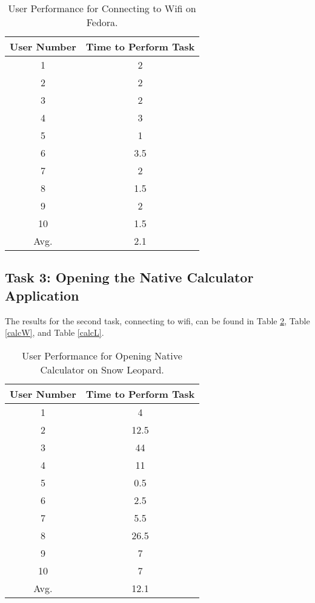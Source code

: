 \documentclass[11pt,letterpaper]{report}
\begin{document}
\begin{table}
    \centering
    \begin{tabular}{| c | c |}
        \hline
        User Number & Time to Perform Task \\ \hline
        1 & 2 \\  \hline
        2 & 2 \\  \hline
        3 & 2 \\ \hline
        4 & 3 \\  \hline
        5 & 1 \\    \hline
        6 & 3.5 \\  \hline
        7 & 2 \\ \hline
        8 & 1.5 \\  \hline
        9 & 2 \\ \hline
        10 & 1.5 \\ \hline
        Avg. & 2.1 \\
        \hline
    \end{tabular}
    \caption{User Performance for Connecting to Wifi on Fedora.}
    \label{wifiL}    
\end{table}


\subsection{Task 3: Opening the Native Calculator Application}

The results for the second task, connecting to wifi, can be found in Table \ref{calcM}, Table \ref{calcW}, and Table \ref{calcL}.

\begin{table}
    \centering
    \begin{tabular}{| c | c |}
        \hline
        User Number & Time to Perform Task \\ \hline
        1 & 4 \\  \hline
        2 & 12.5 \\  \hline
        3 & 44 \\ \hline
        4 & 11 \\  \hline
        5 & 0.5 \\    \hline
        6 & 2.5 \\  \hline
        7 & 5.5 \\ \hline
        8 & 26.5 \\  \hline
        9 & 7 \\ \hline
        10 & 7 \\ \hline
        Avg. & 12.1 \\
        \hline
    \end{tabular}
    \caption{User Performance for Opening Native Calculator on Snow Leopard.}
    \label{calcM}    
\end{table}
\end{document}
